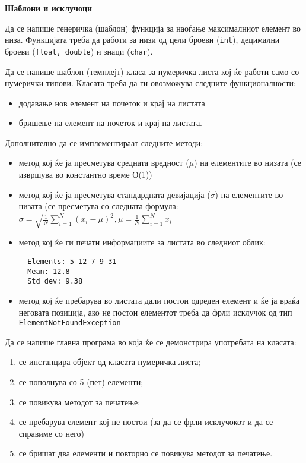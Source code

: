 \documentclass[12pt,a4paper]{exam}
\begin{document}
\pagestyle{headandfoot}
\headrule
{}
\begin{center}
\Large{\textbf{Шаблони и исклучоци}}
\end{center}
\begin{questions}

\question
Да се напише генеричка (шаблон) функција за наоѓање максималниот елемент во
низа. Функцијата треба да работи за низи од цели броеви (\texttt{int}), децимални броеви
(\texttt{float, double}) и знаци (\texttt{char}).

\question
Да се напише шаблон (темплејт) класа за нумеричка листа кој ќе работи само со нумерички
типови. Класата треба да ги овозможува следните функционалности: 
\begin{itemize}
  \item додавање нов елемент на почеток и крај на листата
  \item бришење на елемент на почеток и крај на листата.  
\end{itemize}
Дополнително да се имплементираат следните методи: 
\begin{itemize}
  \item метод кој ќе ја пресметува средната вредност ($\mu$) на елементите во
  низата (се извршува во константно време О(1))
  \item метод кој ќе ја пресметува стандардната девијација ($\sigma$) на
  елементите во низата (се пресметува со следната формула: $\sigma =
  \sqrt{\frac{1}{N} \sum_{i=1}^N (x_i - \mu)^2}, \mu =
  \frac{1}{N} \sum_{i=1}^N x_i$
  \item метод кој ќе ги печати информациите за листата во следниот облик:
  \begin{verbatim}
  Elements: 5 12 7 9 31
  Mean: 12.8
  Std dev: 9.38  
  \end{verbatim}
  \item метод кој ќе пребарува во листата дали постои одреден елемент и ќе ја
  враќа неговата позиција, ако не постои елементот треба да фрли исклучок од тип
  \texttt{ElementNotFoundException}
\end{itemize}

Да се напише главна програма во која ќе се демонстрира употребата на класата:
\begin{enumerate}
  \item се инстанцира објект од класата нумеричка листа;
  \item се пополнува со 5 (пет) елементи;
  \item се повикува методот за печатење;
  \item се пребарува елемент кој не постои (за да се фрли исклучокот и да се
  справиме со него)
  \item се бришат два елементи и повторно се повикува методот за печатење.
\end{enumerate}

\end{questions}
\end{document}
